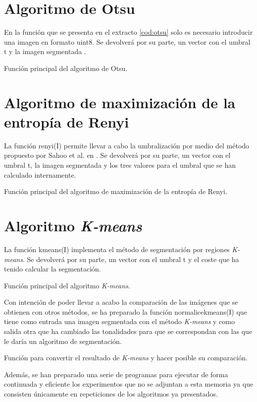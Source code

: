 \section{Algoritmo de Otsu}
En la función que se presenta en el extracto \ref{cod:otsu} solo es necesario introducir una imagen en formato {\ttfamily uint8}. Se devolverá por su parte, un vector con el umbral {\ttfamily t} y la imagen segmentada \cite{art:otsu}.
\begin{listing}
    \caption{Función principal del algoritmo de Otsu.\label{cod:otsu}}
\end{listing}


\section{Algoritmo de maximización de la entropía de Renyi}
La función {\ttfamily renyi(I)} permite llevar a cabo la umbralización por medio del método propuesto por Sahoo et al. en \cite{art:sahoo}. Se devolverá por su parte, un vector con el umbral {\ttfamily t}, la imagen segmentada y los tres valores para el umbral que se han calculado internamente.
\begin{listing}
    \caption{Función principal del algoritmo de maximización de la entropía de Renyi.\label{cod:renyi}}
\end{listing}


\section{Algoritmo {\em K-means}}
La función {\ttfamily kmeans(I)} implementa el método de segmentación por regiones {\em K-means}. Se devolverá por su parte, un vector con el umbral {\ttfamily t} y el coste que ha tenido calcular la segmentación.
\begin{listing}
    \caption{Función principal del algoritmo {\em K-means}.\label{cod:kmeans}}
\end{listing}

Con intención de poder llevar a acabo la comparación de las imágenes que se obtienen con otros métodos, se ha preparado la función {\ttfamily normalicekmeans(I)} que tiene como entrada una imagen segmentada con el método {\em K-means} y como salida otra que ha cambiado las tonalidades para que se correspondan con las que le daría un algoritmo de segmentación.
\begin{listing}
    \caption{Función para convertir el resultado de {\em K-means} y hacer posible su comparación.\label{cod:kmeansnormalice}}
\end{listing}

Además, se han preparado una serie de programas para ejecutar de forma continuada y eficiente los experimentos que no se adjuntan a esta memoria ya que consisten únicamente en repeticiones de los algoritmos ya presentados.